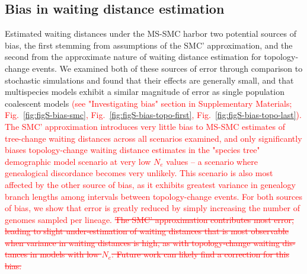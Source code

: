 \documentclass[11pt]{article}
\begin{document}
\subsection{Bias in waiting distance estimation}
Estimated waiting distances under the MS-SMC harbor two potential sources of bias, 
the first stemming from assumptions of the SMC' approximation, and the second from 
the approximate nature of waiting distance estimation for topology-change events. 
We examined both of these sources of error through comparison to stochastic simulations
and found that their effects are generally small, and that multispecies models exhibit 
a similar magnitude of error as single population coalescent models 
\textcolor{red}{
(see "Investigating bias" section in Supplementary Materials; 
Fig.~\ref{fig:figS-bias-smc}, 
Fig.~\ref{fig:figS-bias-topo-first}, 
Fig.~\ref{fig:figS-bias-topo-last}).
The SMC' approximation introduces very little bias to MS-SMC estimates of 
tree-change waiting distances across all scenarios examined, and only 
significantly biases topology-change waiting distance estimates in the 
"species tree" demographic model scenario at very low $N_e$ values -- a 
scenario where genealogical discordance becomes very unlikely. 
This scenario is also most affected by the other source of bias, as
it exhibits greatest variance in genealogy branch lengths among
intervals between topology-change events. For both sources of bias, 
we show that error is greatly reduced by simply increasing the number
of genomes sampled per lineage.
\sout{
The SMC’ approximation contributes most error, leading to slight under-estimation of waiting distances
that is most observable when variance in waiting distances is high, as with topology-change waiting dis-
tances in models with low $N_e$. Future work can likely find a correction for this bias.
}
}




\end{document}
